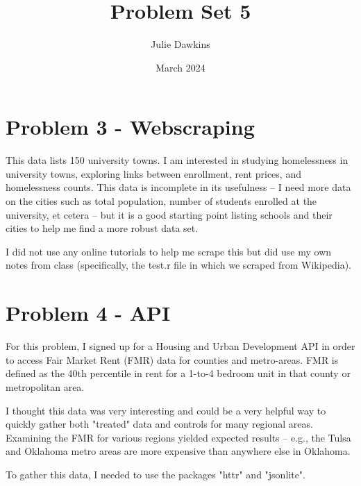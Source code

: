 \documentclass[12pt]{article}
\title{Problem Set 5}
\author{Julie Dawkins}
\date{March 2024}
\begin{document}
\maketitle

\section*{Problem 3 - Webscraping}
This data lists 150 university towns. I am interested in studying homelessness in university towns, exploring links between enrollment, rent prices, and homelessness counts. This data is incomplete in its usefulness -- I need more data on the cities such as total population, number of students enrolled at the university, et cetera -- but it is a good starting point listing schools and their cities to help me find a more robust data set. 

I did not use any online tutorials to help me scrape this but did use my own notes from class (specifically, the test.r file in which we scraped from Wikipedia). 
\section*{Problem 4 - API}
For this problem, I signed up for a Housing and Urban Development API in order to access Fair Market Rent (FMR) data for counties and metro-areas. FMR is defined as the 40th percentile in rent for a 1-to-4 bedroom unit in that county or metropolitan area. 

I thought this data was very interesting and could be a very helpful way to quickly gather both "treated" data and controls for many regional areas. Examining the FMR for various regions yielded expected results -- e.g., the Tulsa and Oklahoma metro areas are more expensive than anywhere else in Oklahoma. 

To gather this data, I needed to use the packages "httr" and "jsonlite". 
\end{document}
